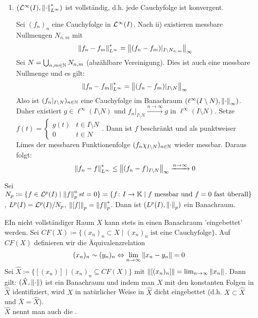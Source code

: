 \begin{beispiel*}
\begin{enumerate}
\begin{beweis}
\end{beweis}
\item $ (\mathcal L^\infty(I),\left\|\cdot\right\|^\ast_{L^\infty}) $ ist vollst\"andig, d.h. jede Cauchyfolge ist konvergent.
\begin{beweis}
Sei $ (f_n)_n $ eine Cauchyfolge in $ \mathcal L^\infty(I) $. Nach ii) existieren messbare Nullmengen $ N_{n,m} $ mit
\[ \left\|f_n-f_m\right\|_{L^\infty}^\ast=\left\|(f_n-f_m)|_{I\setminus N_{n,m}}\right\|_\infty \]
Sei $ N=\bigcup_{n,m\in\mathbb{N}} N_{n,m} $ (abz\"ahlbare Vereinigung). Dies ist auch eine messbare Nullmenge und es gilt:
\[ \left\|f_n-f_m\right\|^\ast_{L^\infty}=\left\|(f_n-f_m)|_{I\setminus N}\right\|_\infty \]
Also ist $ (f_n|_{I\setminus N})_{n\in\mathbb{N}} $ eine Cauchyfolge im Banachraum $ (\ell^\infty(I\setminus N),\left\|\cdot\right\|_\infty) $. Daher existiert $ g\in\ell^\infty(I\setminus N) $ und $ f_n|_{I\setminus N}\xrightarrow{n\to\infty}g $ in $ \ell^\infty(I\setminus N) $. Setze $ f(t)= \begin{cases}
g(t)&t\in I\setminus N\\0&t\in N
\end{cases} $. Dann ist $ f $ beschr\"ankt und als punktweiser Limes der messbaren Funktionenfolge $ (f_n\chi_{I\setminus N})_{n\in\mathbb{N}} $ wieder messbar. Daraus folgt:
\[ \left\|f_n-f\right\|^\ast_{L^\infty}\leq\left\|(f_n-f)_{I\setminus N}\right\|_\infty\xrightarrow{n\to\infty}0 \]
\end{beweis}
\end{enumerate}
\end{beispiel*}
Sei $ N_p\coloneqq\lbrace f\in\mathcal L^p(I)\mid\left\|f\right\|_p^ast=0\rbrace =\lbrace f\colon I\rightarrow\mathbb{K}\mid f\text{ messbar und } f=0\text{ fast \"uberall}\rbrace $, $ L^p(I)=\mathcal L^p(I)/N_p $, $ \left\|[f]\right\|_p=\left\|f\right\|_p^\ast $. Dann ist $ (L^p(I), \left\|\cdot\right\|_p) $ ein Banachraum.
\begin{bemerkung*}
EIn nicht vollst\"andiger Raum $ X $ kann stets in einen Banachraum 'eingebettet' werden. Sei $ CF(X)\coloneqq\lbrace (x_n)_n\subset X\mid (x_n)_n\text{ ist eine Cauchyfolge}\rbrace $. Auf $ CF(X) $ definieren wir die \"Aquivalenzrelation
\[ (x_n)_n\sim(y_n)_n\Leftrightarrow\lim_{n\to\infty}\left\|x_n-y_n\right\|=0 \]
Sei $ \hat X\coloneqq\lbrace [(x_n)]\mid (x_n)_n\subseteq CF(X)\rbrace $ mit $ \left\|[(x_n)_n]\right\|=\lim_{n\to\infty}\left\|x_n\right\| $. Dann gilt: $ (\hat X,\left\|\cdot\right\|) $ ist ein Banachraum und indem man $ X $ mit den konstanten Folgen in $ \hat X $ identifiziert, wird $ X $ in nat\"urlicher Weise in $ \hat X $ dicht eingebettet (d.h. $ X\subset \hat X $ und $ \bar X=\hat X $).\\
$ \hat X $ nennt man auch die .
\end{bemerkung*}
